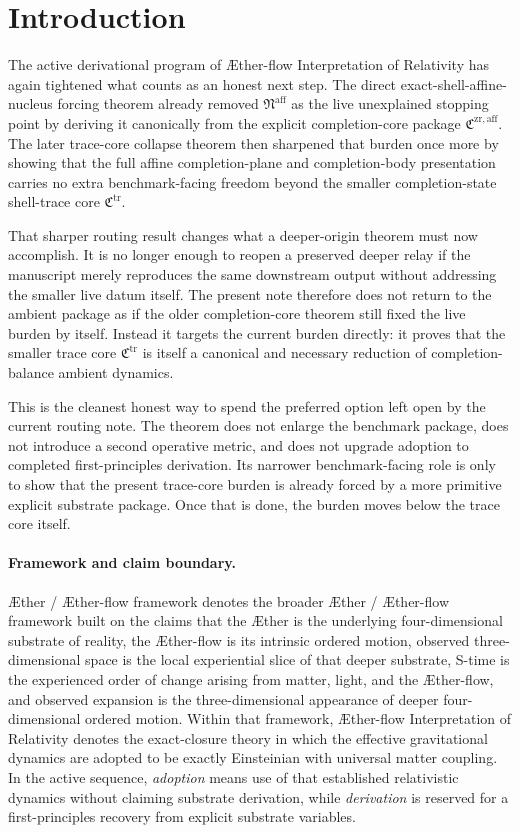 \documentclass[11pt]{article}
\newcommand{\Aether}{\AE{}ther}
\newcommand{\Aflow}{\AE{}ther-flow}
\newcommand{\TheoryName}{\Aflow{} Interpretation of Relativity}
\newcommand{\TheoryProgram}{\Aether{} / \Aflow{} framework}
\newcommand{\CompletionCore}{\mathfrak C^{\mathrm{zr,aff}}}
\newcommand{\TraceCore}{\mathfrak C^{\mathrm{tr}}}
\newcommand{\AffineNucleus}{\mathfrak N^{\mathrm{aff}}}
\begin{document}
\section{Introduction}

The active derivational program of \TheoryName{} has again tightened what counts as an honest next step. The direct exact-shell-affine-nucleus forcing theorem already removed \(\AffineNucleus\) as the live unexplained stopping point by deriving it canonically from the explicit completion-core package \(\CompletionCore\). The later trace-core collapse theorem then sharpened that burden once more by showing that the full affine completion-plane and completion-body presentation carries no extra benchmark-facing freedom beyond the smaller completion-state shell-trace core \(\TraceCore\).

That sharper routing result changes what a deeper-origin theorem must now accomplish. It is no longer enough to reopen a preserved deeper relay if the manuscript merely reproduces the same downstream output without addressing the smaller live datum itself. The present note therefore does not return to the ambient package as if the older completion-core theorem still fixed the live burden by itself. Instead it targets the current burden directly: it proves that the smaller trace core \(\TraceCore\) is itself a canonical and necessary reduction of completion-balance ambient dynamics.

This is the cleanest honest way to spend the preferred option left open by the current routing note. The theorem does not enlarge the benchmark package, does not introduce a second operative metric, and does not upgrade adoption to completed first-principles derivation. Its narrower benchmark-facing role is only to show that the present trace-core burden is already forced by a more primitive explicit substrate package. Once that is done, the burden moves below the trace core itself.

\paragraph{Framework and claim boundary.}
\TheoryProgram{} denotes the broader \Aether{} / \Aflow{} framework built on the claims that the \Aether{} is the underlying four-dimensional substrate of reality, the \Aflow{} is its intrinsic ordered motion, observed three-dimensional space is the local experiential slice of that deeper substrate, S-time is the experienced order of change arising from matter, light, and the \Aflow{}, and observed expansion is the three-dimensional appearance of deeper four-dimensional ordered motion. Within that framework, \TheoryName{} denotes the exact-closure theory in which the effective gravitational dynamics are adopted to be exactly Einsteinian with universal matter coupling. In the active sequence, \emph{adoption} means use of that established relativistic dynamics without claiming substrate derivation, while \emph{derivation} is reserved for a first-principles recovery from explicit substrate variables.
\end{document}

